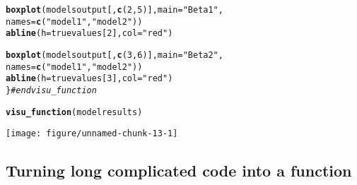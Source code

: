 \documentclass[12pt,a4paper]{scrartcl}\usepackage[]{graphicx}\usepackage[]{color}
\makeatletter
\def\maxwidth{ %
  \ifdim\Gin@nat@width>\linewidth
    \linewidth
  \else
    \Gin@nat@width
  \fi
}
\newcommand{\hlnum}[1]{\textcolor[rgb]{0.686,0.059,0.569}{#1}}%
\newcommand{\hlstr}[1]{\textcolor[rgb]{0.192,0.494,0.8}{#1}}%
\newcommand{\hlcom}[1]{\textcolor[rgb]{0.678,0.584,0.686}{\textit{#1}}}%
\newcommand{\hlstd}[1]{\textcolor[rgb]{0.345,0.345,0.345}{#1}}%
\newcommand{\hlkwc}[1]{\textcolor[rgb]{0.333,0.667,0.333}{#1}}%
\newcommand{\hlkwd}[1]{\textcolor[rgb]{0.737,0.353,0.396}{\textbf{#1}}}%
\newenvironment{kframe}{%
 \def\at@end@of@kframe{}%
 \ifinner\ifhmode%
  \def\at@end@of@kframe{\end{minipage}}%
  \begin{minipage}{\columnwidth}%
 \fi\fi%
 \def\FrameCommand##1{\hskip\@totalleftmargin \hskip-\fboxsep
 \colorbox{shadecolor}{##1}\hskip-\fboxsep
     \hskip-\linewidth \hskip-\@totalleftmargin \hskip\columnwidth}%
 \MakeFramed {\advance\hsize-\width
   \@totalleftmargin\z@ \linewidth\hsize
   \@setminipage}}%
 {\par\unskip\endMakeFramed%
 \at@end@of@kframe}
\newenvironment{knitrout}{}{} %
\makeatother
\begin{document}
\begin{Exercise}[difficulty=2, title={Combine several functions together}]
\begin{knitrout}
\begin{kframe}
\begin{alltt}
  \hlkwd{boxplot}\hlstd{(modelsoutput[,}\hlkwd{c}\hlstd{(}\hlnum{2}\hlstd{,}\hlnum{5}\hlstd{)],} \hlkwc{main}\hlstd{=} \hlstr{"Beta1"}\hlstd{,}
          \hlkwc{names} \hlstd{=} \hlkwd{c}\hlstd{(}\hlstr{"model1"}\hlstd{,} \hlstr{"model2"}\hlstd{))}
  \hlkwd{abline}\hlstd{(}\hlkwc{h}\hlstd{=truevalues[}\hlnum{2}\hlstd{],} \hlkwc{col}\hlstd{=}\hlstr{"red"}\hlstd{)}

  \hlkwd{boxplot}\hlstd{(modelsoutput[,}\hlkwd{c}\hlstd{(}\hlnum{3}\hlstd{,}\hlnum{6}\hlstd{)],} \hlkwc{main}\hlstd{=} \hlstr{"Beta2"}\hlstd{,}
          \hlkwc{names} \hlstd{=} \hlkwd{c}\hlstd{(}\hlstr{"model1"}\hlstd{,} \hlstr{"model2"}\hlstd{))}
  \hlkwd{abline}\hlstd{(}\hlkwc{h}\hlstd{=truevalues[}\hlnum{3}\hlstd{],} \hlkwc{col}\hlstd{=}\hlstr{"red"}\hlstd{)}
\hlstd{\}}\hlcom{#end visu_function}

\hlkwd{visu_function}\hlstd{(modelresults)}
\end{alltt}
\end{kframe}
\texttt{[image: figure/unnamed-chunk-13-1]} 

\end{knitrout}


\end{Exercise}
\begin{Answer}

\end{Answer}

\subsection{Turning long complicated code into a function}
\end{document}
